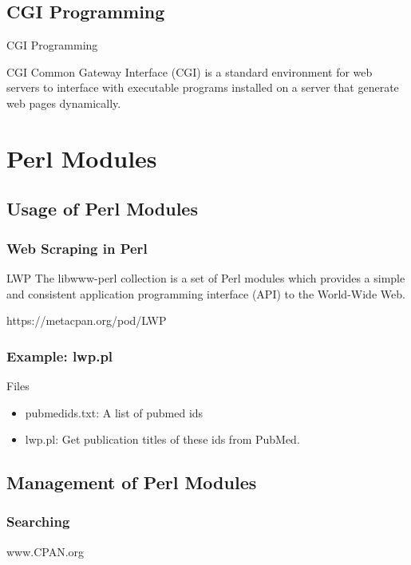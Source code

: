 \documentclass[UTF8]{beamer}
\begin{document}
\subsection{CGI Programming}
\begin{frame}[t]{CGI Programming}
    \begin{block}{CGI}
        Common Gateway Interface (CGI) is a standard environment for web servers to interface with executable programs installed on a server that generate web pages dynamically.
    \end{block}

\end{frame}


\section{Perl Modules}

\subsection{Usage of Perl Modules}

\begin{frame}
  \frametitle{Web Scraping in Perl}
  \begin{block}{LWP}
    The libwww-perl collection is a set of Perl modules which provides a simple
    and consistent application programming interface (API) to the World-Wide Web.

    https://metacpan.org/pod/LWP
  \end{block}
\end{frame}

\begin{frame}
  \frametitle{Example: lwp.pl}
\begin{block}{Files}
  \begin{itemize}
    \item pubmedids.txt: A list of pubmed ids
    \item lwp.pl: Get publication titles of these ids from PubMed.
  \end{itemize}
\end{block}
\end{frame}

\subsection{Management of Perl Modules}

\begin{frame}
  \frametitle{Searching}
  \centerline{www.CPAN.org}
\end{frame}
\end{document}
